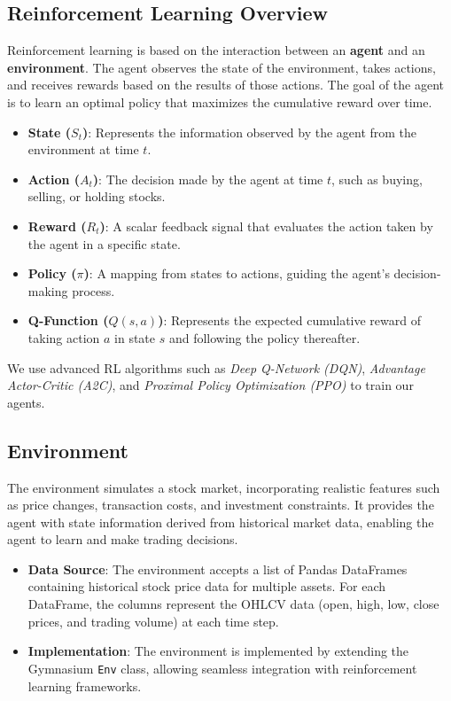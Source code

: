 \documentclass[conference]{IEEEtran}
\begin{document}
\subsection{Reinforcement Learning Overview}

Reinforcement learning is based on the interaction between an \textbf{agent} and an \textbf{environment}. The agent observes the state of the environment, takes actions, and receives rewards based on the results of those actions. The goal of the agent is to learn an optimal policy that maximizes the cumulative reward over time.

\begin{itemize}
  \item \textbf{State ($S_t$)}: Represents the information observed by the agent from the environment at time $t$.
  \item \textbf{Action ($A_t$)}: The decision made by the agent at time $t$, such as buying, selling, or holding stocks.
  \item \textbf{Reward ($R_t$)}: A scalar feedback signal that evaluates the action taken by the agent in a specific state.
  \item \textbf{Policy ($\pi$)}: A mapping from states to actions, guiding the agent's decision-making process.
  \item \textbf{Q-Function ($Q(s, a)$)}: Represents the expected cumulative reward of taking action $a$ in state $s$ and following the policy thereafter.
\end{itemize}

We use advanced RL algorithms such as \textit{Deep Q-Network (DQN)}, \textit{Advantage Actor-Critic (A2C)}, and \textit{Proximal Policy Optimization (PPO)} to train our agents.

\subsection{Environment}

The environment simulates a stock market, incorporating realistic features such as price changes, transaction costs, and investment constraints. It provides the agent with state information derived from historical market data, enabling the agent to learn and make trading decisions.

\begin{itemize}
  \item \textbf{Data Source}: The environment accepts a list of Pandas DataFrames containing historical stock price data for multiple assets. For each DataFrame, the columns represent the OHLCV data (open, high, low, close prices, and trading volume) at each time step.
  \item \textbf{Implementation}: The environment is implemented by extending the Gymnasium \texttt{Env} class, allowing seamless integration with reinforcement learning frameworks.
\end{itemize}
\end{document}
